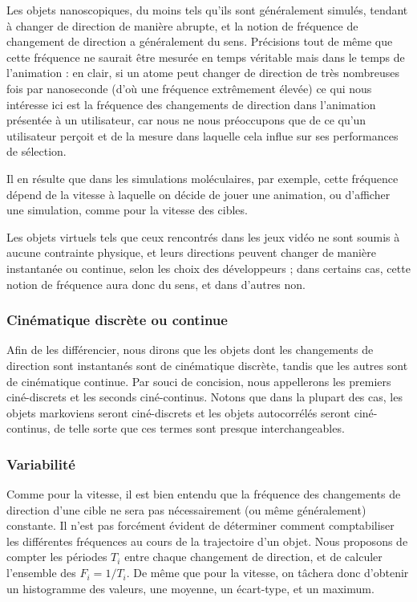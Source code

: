 	Les objets nanoscopiques, du moins tels qu'ils sont généralement simulés, tendant à changer de direction de manière abrupte, et la notion de fréquence de changement de direction a généralement du sens. Précisions tout de même que cette fréquence ne saurait être mesurée en temps véritable mais dans le temps de l'animation : en clair, si un atome peut changer de direction de très nombreuses fois par nanoseconde (d'où une fréquence extrêmement élevée) ce qui nous intéresse ici est la fréquence des changements de direction dans l'animation présentée à un utilisateur, car nous ne nous préoccupons que de ce qu'un utilisateur perçoit et de la mesure dans laquelle cela influe sur ses performances de sélection.
	
	Il en résulte que dans les simulations moléculaires, par exemple, cette fréquence dépend de la vitesse à laquelle on décide de jouer une animation, ou d'afficher une simulation, comme pour la vitesse des cibles.
	
	Les objets virtuels tels que ceux rencontrés dans les jeux vidéo ne sont soumis à aucune contrainte physique, et leurs directions peuvent changer de manière instantanée ou continue, selon les choix des développeurs ; dans certains cas, cette notion de fréquence aura donc du sens, et dans d'autres non.
	
	\subsubsection{Cinématique discrète ou continue}
	Afin de les différencier, nous dirons que les objets dont les changements de direction sont instantanés sont de cinématique discrète, tandis que les autres sont de cinématique continue. Par souci de concision, nous appellerons les premiers ciné-discrets et les seconds ciné-continus. Notons que dans la plupart des cas, les objets markoviens seront ciné-discrets et les objets autocorrélés seront ciné-continus, de telle sorte que ces termes sont presque interchangeables.
	
	\subsubsection{Variabilité}
	Comme pour la vitesse, il est bien entendu que la fréquence des changements de direction d'une cible ne sera pas nécessairement (ou même généralement) constante. Il n'est pas forcément évident de déterminer comment comptabiliser les différentes fréquences au cours de la trajectoire d'un objet. Nous proposons de compter les périodes $T_{i}$ entre chaque changement de direction, et de calculer l'ensemble des $F_{i} = 1/T_{i}$. De même que pour la vitesse, on tâchera donc d'obtenir un histogramme des valeurs, une moyenne, un écart-type, et un maximum.
	
